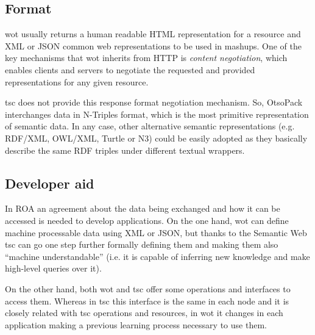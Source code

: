\subsection{Format}
\ac{wot} usually returns a human readable HTML representation for a resource and XML or JSON common web representations to be used in mashups. One of the
key mechanisms that \ac{wot} inherits from HTTP is \textit{content negotiation}, which enables clients and servers to negotiate the requested and
provided representations for any given resource.

\ac{tsc} does not provide this response format negotiation mechanism. So, OtsoPack interchanges data in N-Triples format, which is the most primitive
representation of semantic data. In any case, other alternative semantic representations (e.g. RDF/XML, OWL/XML, Turtle or N3) could be
easily adopted as they basically describe the same RDF triples under different textual wrappers.

\subsection{Developer aid}%
In ROA an agreement about the data being exchanged and how it can be accessed is needed to develop applications.
On the one hand, \ac{wot} can define machine processable data using XML or JSON, but thanks to the Semantic Web \ac{tsc} can go one step
further formally defining them and making them also ``machine understandable'' (i.e. it is capable of inferring new knowledge and make
high-level queries over it).

On the other hand, both \ac{wot} and \ac{tsc} offer some operations and interfaces to access them. Whereas in \ac{tsc} this interface is the same in each node
and it is closely related with \ac{tsc} operations and resources, in \ac{wot} it changes in each application making a previous learning process necessary
to use them.



